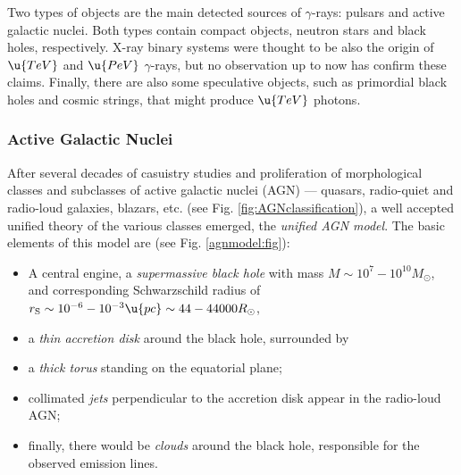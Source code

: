 Two types of objects are the main detected sources of $\gamma$-rays:
pulsars and active galactic nuclei. Both types contain compact
objects, neutron stars and black holes, respectively. X-ray binary
systems were thought to be also the origin of $\u{TeV}$ and $\u{PeV}$
$\gamma$-rays, but no observation up to now has confirm these claims.
Finally, there are also some speculative objects, such as primordial
black holes and cosmic strings, that might produce $\u{TeV}$ photons.

\subsubsection{Active Galactic Nuclei}
\label{sec:agn}

After several decades of casuistry studies and proliferation of
morphological classes and subclasses of active galactic nuclei (AGN)
--- quasars, radio-quiet and radio-loud galaxies, blazars, etc. (see
Fig.  \ref{fig:AGNclassification}), a well accepted unified theory of
the various classes emerged, the \emph{unified AGN model}. The basic
elements of this model are (see Fig. \ref{agnmodel:fig}):

\AGNclassificationfig

\begin{itemize}
\item A central engine, a \emph{supermassive black hole} with mass
  $M\sim 10^{7} - 10^{10} M_\odot$, and corresponding Schwarzschild
  radius of $r_{\mathrm{S}} \sim 10^{-6} - 10^{-3}\u{pc} \sim 44 -
  44000 R_\odot$,

\item a \emph{thin accretion disk} around  the black hole, surrounded by

\item a \emph{thick torus} standing on the equatorial plane;
  
\item collimated \emph{jets} perpendicular to the accretion disk
  appear in the radio-loud AGN;
  
\item finally, there would be \emph{clouds} around the black hole,
  responsible for the observed emission lines.
\end{itemize}

\agnartisticviewfig

